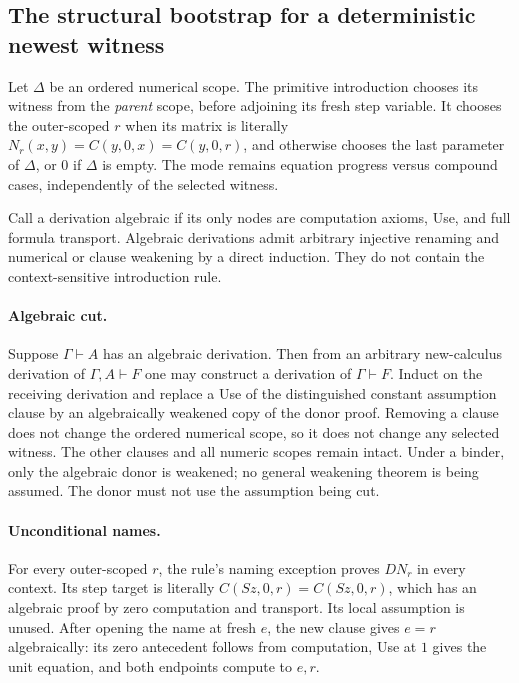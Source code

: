 \subsection{The structural bootstrap for a deterministic newest witness}

Let $\Delta$ be an ordered numerical scope. The primitive introduction
chooses its witness from the \emph{parent} scope, before adjoining its fresh
step variable. It chooses the outer-scoped $r$ when its matrix is literally
$N_r(x,y)=C(y,0,x)=C(y,0,r)$, and otherwise chooses the last parameter of
$\Delta$, or $0$ if $\Delta$ is empty. The mode remains equation progress
versus compound cases, independently of the selected witness.

Call a derivation algebraic if its only nodes are computation axioms, Use,
and full formula transport. Algebraic derivations admit arbitrary injective
renaming and numerical or clause weakening by a direct induction. They do
not contain the context-sensitive introduction rule.

\paragraph{Algebraic cut.}
Suppose $\Gamma\vdash A$ has an algebraic derivation. Then from an arbitrary
new-calculus derivation of $\Gamma,A\vdash F$ one may construct a derivation
of $\Gamma\vdash F$. Induct on the receiving derivation and replace a Use
of the distinguished constant assumption clause by an algebraically weakened
copy of the donor proof. Removing a clause does not change the ordered
numerical scope, so it does not change any selected witness. The other
clauses and all numeric scopes remain intact. Under a binder, only the
algebraic donor is weakened; no general weakening theorem is being assumed.
The donor must not use the assumption being cut.

\paragraph{Unconditional names.}
For every outer-scoped $r$, the rule's naming exception proves $D N_r$ in
every context. Its step target is literally $C(Sz,0,r)=C(Sz,0,r)$, which
has an algebraic proof by zero computation and transport. Its local
assumption is unused. After opening the name at fresh $e$, the new clause
gives $e=r$ algebraically: its zero antecedent follows from computation,
Use at $1$ gives the unit equation, and both endpoints compute to $e,r$.

